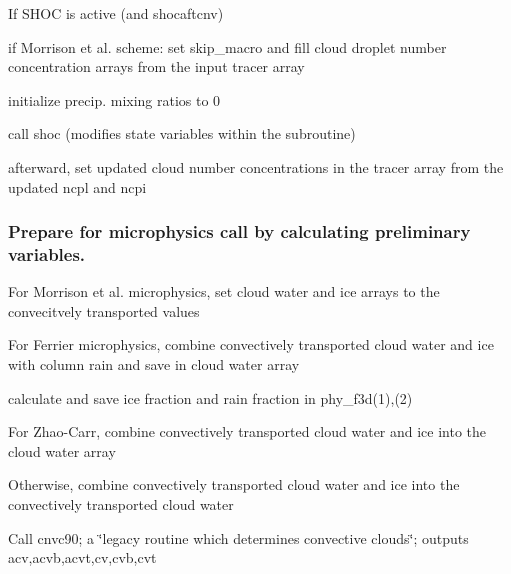 \begin{DoxyItemize}
\begin{DoxyItemize}
\begin{DoxyItemize}
\end{DoxyItemize}
\end{DoxyItemize}
\item If S\+H\+OC is active (and shocaftcnv)
\begin{DoxyItemize}
\item if Morrison et al. scheme\+: set \textquotesingle{}skip\+\_\+macro\textquotesingle{} and fill cloud droplet number concentration arrays from the input tracer array
\item initialize precip. mixing ratios to 0
\item call \textquotesingle{}shoc\textquotesingle{} (modifies state variables within the subroutine)
\item afterward, set updated cloud number concentrations in the tracer array from the updated \textquotesingle{}ncpl\textquotesingle{} and \textquotesingle{}ncpi\textquotesingle{}
\end{DoxyItemize}
\end{DoxyItemize}

\subsubsection*{Prepare for microphysics call by calculating preliminary variables.}


\begin{DoxyItemize}
\item For Morrison et al. microphysics, set cloud water and ice arrays to the convecitvely transported values
\item For Ferrier microphysics, combine convectively transported cloud water and ice with column rain and save in cloud water array
\begin{DoxyItemize}
\item calculate and save ice fraction and rain fraction in phy\+\_\+f3d(1),(2)
\end{DoxyItemize}
\item For Zhao-\/\+Carr, combine convectively transported cloud water and ice into the cloud water array
\item Otherwise, combine convectively transported cloud water and ice into the convectively transported cloud water
\item Call \textquotesingle{}cnvc90\textquotesingle{}; a \char`\"{}legacy routine which determines convective clouds\char`\"{}; outputs \textquotesingle{}acv\textquotesingle{},\textquotesingle{}acvb\textquotesingle{},\textquotesingle{}acvt\textquotesingle{},\textquotesingle{}cv\textquotesingle{},\textquotesingle{}cvb\textquotesingle{},\textquotesingle{}cvt\textquotesingle{}
\end{DoxyItemize}


